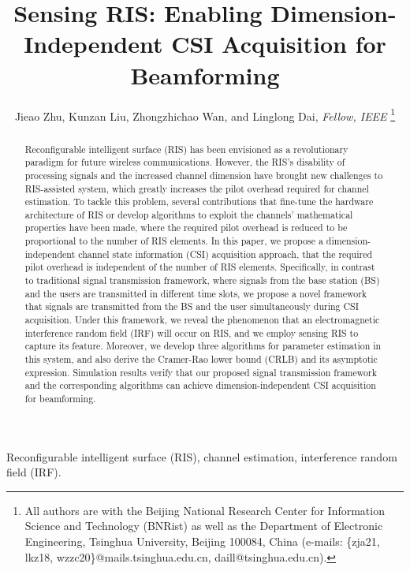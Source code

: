 \documentclass[12pt,draftclsnofoot,journal,onecolumn]{IEEEtran}
\theoremstyle{nonumberplain}
\begin{document}
\title{Sensing RIS: Enabling Dimension-Independent CSI Acquisition for Beamforming}
\author{{Jieao Zhu, Kunzan Liu, Zhongzhichao Wan, and Linglong Dai, {\textit{Fellow, IEEE}}
\vspace*{-3em}}
\thanks{All authors are with the Beijing National Research Center for Information Science and Technology (BNRist) as well as the Department of Electronic Engineering, Tsinghua University, Beijing 100084, China (e-mails: \{zja21, lkz18, wzzc20\}@mails.tsinghua.edu.cn, daill@tsinghua.edu.cn).}
}

\maketitle

\begin{abstract}
Reconfigurable intelligent surface (RIS) has been envisioned as a revolutionary paradigm for future wireless communications.
However, the RIS's disability of processing signals and the increased channel dimension have brought new challenges to RIS-assisted system, which greatly increases the pilot overhead required for channel estimation.
To tackle this problem, several contributions that fine-tune the hardware architecture of RIS or develop algorithms to exploit the channels' mathematical properties have been made, where the required pilot overhead is reduced to be proportional to the number of RIS elements.
In this paper, we propose a dimension-independent channel state information (CSI) acquisition approach, that the required pilot overhead is independent of the number of RIS elements.
Specifically, in contrast to traditional signal transmission framework, where signals from the base station (BS) and the users are transmitted in different time slots, we propose a novel framework that signals are transmitted from the BS and the user simultaneously during CSI acquisition.
Under this framework, we reveal the phenomenon that an electromagnetic interference random field (IRF) will occur on RIS, and we employ sensing RIS to capture its feature.
Moreover, we develop three algorithms for parameter estimation in this system, and also derive the Cramer-Rao lower bound (CRLB) and its asymptotic expression.
Simulation results verify that our proposed signal transmission framework and the corresponding algorithms can achieve dimension-independent CSI acquisition for beamforming.
\end{abstract}

\begin{IEEEkeywords}
Reconfigurable intelligent surface (RIS), channel estimation, interference random field (IRF).
\end{IEEEkeywords}
\end{document}
